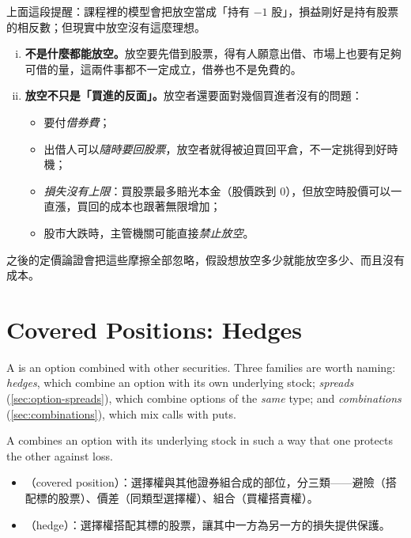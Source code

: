 \begin{remark}
	上面這段提醒：課程裡的模型會把放空當成「持有 $-1$ 股」，損益剛好是持有股票的相反數；但現實中放空沒有這麼理想。
	\begin{enumerate}[(i),nosep]
		\item \textbf{不是什麼都能放空。}放空要先借到股票，得有人願意出借、市場上也要有足夠可借的量，這兩件事都不一定成立，借券也不是免費的。
		\item \textbf{放空不只是「買進的反面」。}放空者還要面對幾個買進者沒有的問題：
		      \begin{itemize}[nosep]
		      	\item 要付\emph{借券費}；
		      	\item 出借人可以\emph{隨時要回股票}，放空者就得被迫買回平倉，不一定挑得到好時機；
		      	\item \emph{損失沒有上限}：買股票最多賠光本金（股價跌到 $0$），但放空時股價可以一直漲，買回的成本也跟著無限增加；
		      	\item 股市大跌時，主管機關可能直接\emph{禁止放空}。
		      \end{itemize}
	\end{enumerate}
	之後的定價論證會把這些摩擦全部忽略，假設想放空多少就能放空多少、而且沒有成本。
\end{remark}
\suppend

\section{Covered Positions: Hedges}
\label{sec:hedges}


\suppstart
A  is an option combined with other securities.
Three families are worth naming: \emph{hedges}, which combine an option with its own underlying stock; \emph{spreads} (\autoref{sec:option-spreads}), which combine options of the \emph{same} type; and \emph{combinations} (\autoref{sec:combinations}), which mix calls with puts.

\begin{definition}
	A  combines an option with its underlying stock in such a way that one protects the other against loss.
\end{definition}

\begin{remark}
	\begin{itemize}[nosep]
		\item {}（covered position）：選擇權與其他證券組合成的部位，分三類——避險（搭配標的股票）、價差（同類型選擇權）、組合（買權搭賣權）。
		\item {}（hedge）：選擇權搭配其標的股票，讓其中一方為另一方的損失提供保護。
	\end{itemize}
\end{remark}
\suppend

